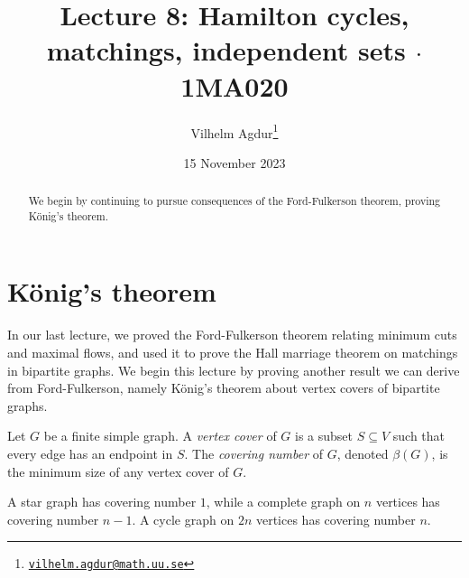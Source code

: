 \documentclass[nobib]{tufte-handout}
\title{Lecture 8: Hamilton cycles, matchings, independent sets $\cdot$ 1MA020}
\author[Vilhelm Agdur]{Vilhelm Agdur\thanks{\href{mailto:vilhelm.agdur@math.uu.se}{\nolinkurl{vilhelm.agdur@math.uu.se}}}}
\date{15 November 2023}
\begin{document}
\maketitle%

\begin{abstract}
\noindent
We begin by continuing to pursue consequences of the Ford-Fulkerson theorem, proving König's theorem.
\end{abstract}

\section{König's theorem}

In our last lecture, we proved the Ford-Fulkerson theorem relating minimum cuts and maximal flows, and used it to prove the Hall marriage theorem on matchings in bipartite graphs. We begin this lecture by proving another result we can derive from Ford-Fulkerson, namely König's theorem about vertex covers of bipartite graphs.

\begin{definition}
    Let $G$ be a finite simple graph. A \emph{vertex cover} of $G$ is a subset $S\subseteq V$ such that every edge has an endpoint in $S$. The \emph{covering number} of $G$, denoted $\beta(G)$, is the minimum size of any vertex cover of $G$.
\end{definition}

\begin{example}
    A star graph has covering number $1$, while a complete graph on $n$ vertices has covering number $n-1$. A cycle graph on $2n$ vertices has covering number $n$.
\end{example}
\end{document}
